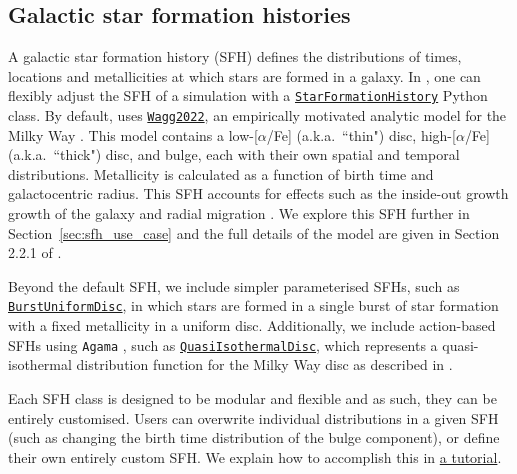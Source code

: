 \documentclass[twocolumn, twocolappendix, oneside]{aastex631}
\newcommand{\codeLink}[2]{{\href{https://cogsworth.readthedocs.io/en/latest/api/cogsworth.#2.#1.html}{\color{codecolour} \texttt{#1}}}}
\newcommand{\tutorialLink}[2]{\href{#1}{{\color{codecolour}#2}}}
\begin{document}
\subsection{Galactic star formation histories}\label{sec:galactic_SFH}

A galactic star formation history (SFH) defines the distributions of times, locations and metallicities at which stars are formed in a galaxy. In \cogsworth, one can flexibly adjust the SFH of a simulation with a \codeLink{StarFormationHistory}{sfh} Python class. By default, \cogsworth uses \codeLink{Wagg2022}{sfh}, an empirically motivated analytic model for the Milky Way \citep{Wagg+2022}. This model contains a low-[$\alpha$/Fe] (a.k.a.~``thin")  disc, high-[$\alpha$/Fe] (a.k.a.~``thick") disc, and bulge, each with their own spatial and temporal distributions. Metallicity is calculated as a function of birth time and galactocentric radius. This SFH accounts for effects such as the inside-out growth growth of the galaxy and radial migration \citep{Frankel+2018, Frankel+2019:2019ApJ...884...99F}. We explore this SFH further in Section~\ref{sec:sfh_use_case} and the full details of the model are given in Section 2.2.1 of \citet{Wagg+2022}.

Beyond the default SFH, we include simpler parameterised SFHs, such as \codeLink{BurstUniformDisc}{sfh}, in which stars are formed in a single burst of star formation with a fixed metallicity in a uniform disc. Additionally, we include action-based SFHs using \texttt{Agama} \citep{2019MNRAS.482.1525V}, such as \codeLink{QuasiIsothermalDisc}{sfh}, which represents a quasi-isothermal distribution function for the Milky Way disc as described in \citet{Sanders+2015:2015MNRAS.449.3479S}.

Each SFH class is designed to be modular and flexible and as such, they can be entirely customised. Users can overwrite individual distributions in a given SFH (such as changing the birth time distribution of the bulge component), or define their own entirely custom SFH. We explain how to accomplish this in \tutorialLink{https://cogsworth.readthedocs.io/en/latest/tutorials/pop_settings/initial_galaxy.html}{a tutorial}.
\end{document}
